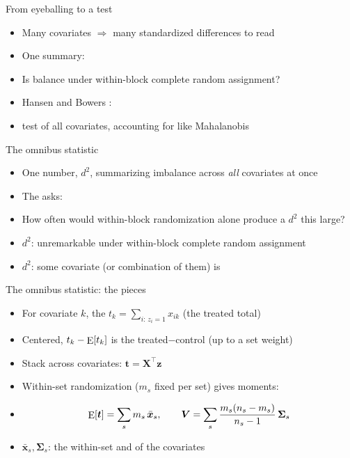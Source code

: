 \documentclass[table, xcolor = {dvipsnames}, 9pt]{beamer}
\theoremstyle{plain}
\newcommand{\mh}[1]{{\color{magenta}{#1}}}
\DeclareMathOperator{\E}{\rm{E}}
\begin{document}
\begin{frame}[t]{From eyeballing to a test \citep{hansenbowers2008}}
\vfill
\begin{itemize} \vfill
\item Many covariates $\Rightarrow$ many standardized differences to read \vfill
\item One summary: \vfill
\item[] Is balance \mh{unusual} under within-block complete random assignment? \vfill
\item Hansen and Bowers \citep{hansenbowers2008}: \vfill
\item[] \mh{Omnibus} test of all covariates, accounting for \mh{correlations} like Mahalanobis \vfill
\end{itemize} \vfill
\end{frame}
\begin{frame}[t]{The omnibus statistic}
\vfill
\begin{itemize} \vfill
\item One number, $d^2$, summarizing imbalance across \emph{all} covariates at once \vfill
\item The \mh{test} asks: \vfill
\item[] How often would within-block randomization alone produce a $d^2$ this large? \vfill
\item \mh{Small} $d^2$: unremarkable under within-block complete random assignment \vfill
\item \mh{Large} $d^2$: some covariate (or combination of them) is \mh{imbalanced} \vfill
\end{itemize} \vfill
\end{frame}
\iffalse  %
\begin{frame}[t]{The omnibus statistic: the pieces}
\vfill
\begin{itemize} \vfill
\item For covariate $k$, the \mh{sum statistic} $t_k = \sum_{i:\, z_i = 1} x_{ik}$ (the treated total) \vfill
\item Centered, $t_k - \E[t_k]$ is the treated$-$control \mh{mean difference} (up to a set weight) \vfill
\item Stack across covariates: $\bm{t} = \bm{X}^{\top}\bm{z}$ \vfill
\item Within-set randomization ($m_s$ fixed per set) gives \mh{known} moments: \vfill
\item[]
\begin{equation*}
\E[\bm{t}] = \sum_s m_s\, \bar{\bm{x}}_s, \qquad \bm{V} = \sum_s \frac{m_s(n_s - m_s)}{n_s - 1}\, \bm{\Sigma}_s
\end{equation*} \vfill
\item $\bar{\bm{x}}_s, \bm{\Sigma}_s$: the within-set \mh{mean} and \mh{covariance} of the covariates \vfill
\end{itemize} \vfill
\end{frame}
\end{document}
